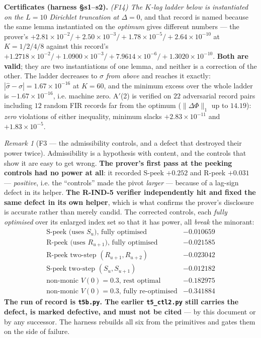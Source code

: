 \documentclass[11pt]{article}
\theoremstyle{definition}
\theoremstyle{remark}
\newtheorem{remark}{Remark}
\begin{document}
\medskip\noindent\textbf{Certificates (harness \S s1--s2).}
\emph{(F14) The $K$-lag ladder below is instantiated on the $L=10$ Dirichlet
truncation at $\Delta=0$}, and that record is named because the same lemma
instantiated on the \emph{optimum} gives different numbers --- the prover's
$+2.81\times10^{-2}/+2.50\times10^{-3}/+1.78\times10^{-5}/+2.64\times10^{-10}$
at $K=1/2/4/8$ against this record's
$+1.2718\times10^{-2}/+1.0900\times10^{-3}/+7.9614\times10^{-6}/
+1.3020\times10^{-10}$. \textbf{Both are valid}; they are two instantiations
of one lemma, and neither is a correction of the other. The ladder decreases
to $\sigma$ \emph{from above} and reaches it exactly:
$|\hat\sigma-\sigma|=1.67\times10^{-16}$ at $K=60$, and the minimum excess
over the whole ladder is $-1.67\times10^{-16}$, i.e. machine zero.
A$'$(2) is verified on $22$ adversarial record pairs including $12$ random FIR
records far from the optimum ($\|\Delta\Phi\|_1$ up to $14.19$): \emph{zero}
violations of either inequality, minimum slacks $+2.83\times10^{-11}$ and
$+1.83\times10^{-5}$.

\begin{remark}[F3 --- the admissibility controls, and a defect that destroyed
their power twice]
\label{rem:F3}
Admissibility is a hypothesis with content, and the controls that show it are
easy to get wrong. \textbf{The prover's first pass at the peeking controls had
no power at all}: it recorded S-peek $\mathbf{+0.252}$ and R-peek
$\mathbf{+0.031}$ --- \emph{positive}, i.e. the ``controls'' made the pivot
\emph{larger} --- because of a lag-sign defect in its helper.
\textbf{The R-IND-5 verifier independently hit and fixed the same defect in
its own helper}, which is what confirms the prover's disclosure is accurate
rather than merely candid. The corrected controls, each \emph{fully optimised}
over its enlarged index set so that it has power, all \emph{break} the
minorant:
\[
\begin{array}{lr}
\text{S-peek (uses }S_u\text{), fully optimised} & -0.010659\\
\text{R-peek (uses }R_{u+1}\text{), fully optimised} & -0.021585\\
\text{R-peek two-step }(R_{u+1},R_{u+2}) & -0.023042\\
\text{S-peek two-step }(S_u,S_{u+1}) & -0.012182\\
\text{non-monic }V(0)=0.3\text{, rest optimal} & -0.182975\\
\text{non-monic }V(0)=0.3\text{, fully re-optimised} & -0.341884
\end{array}
\]
\textbf{The run of record is \texttt{t5b.py}. The earlier
\texttt{t5\_ctl2.py} still carries the defect, is marked defective, and must
not be cited} --- by this document or by any successor. The harness rebuilds
all six from the primitives and gates them on the side of failure.
\end{remark}
\end{document}
